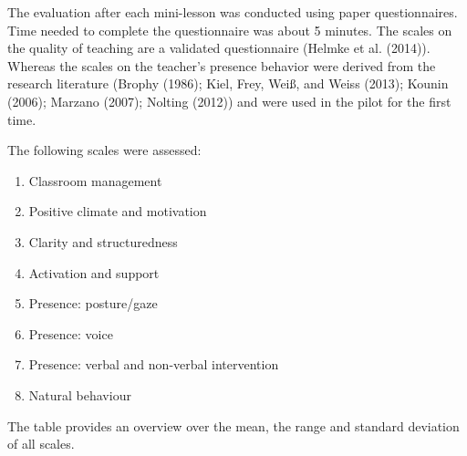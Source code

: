 \documentclass[
  english,
  man,floatsintext]{apa6}
\providecommand{\tightlist}{%
  \setlength{\itemsep}{0pt}\setlength{\parskip}{0pt}}
\begin{document}
The evaluation after each mini-lesson was conducted using paper questionnaires. Time needed to complete the questionnaire was about 5 minutes.
The scales on the quality of teaching are a validated questionnaire (Helmke et al. (2014)). Whereas the scales on the teacher's presence behavior were derived from the research literature (Brophy (1986); Kiel, Frey, Weiß, and Weiss (2013); Kounin (2006); Marzano (2007); Nolting (2012)) and were used in the pilot for the first time.

The following scales were assessed:

\begin{enumerate}
\def\labelenumi{(\arabic{enumi})}
\tightlist
\item
  Classroom management
\item
  Positive climate and motivation
\item
  Clarity and structuredness
\item
  Activation and support
\item
  Presence: posture/gaze
\item
  Presence: voice
\item
  Presence: verbal and non-verbal intervention
\item
  Natural behaviour
\end{enumerate}

The table provides an overview over the mean, the range and standard deviation of all scales.
\end{document}
